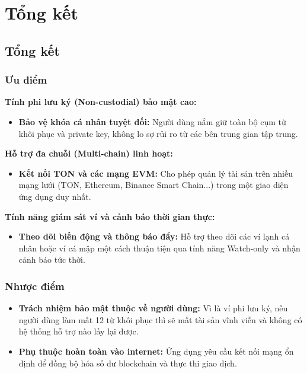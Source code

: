 \documentclass[a4paper]{report}
\begin{document}
\chapter{Tổng kết}

\section{Tổng kết}

\subsection{Ưu điểm}

\textbf{Tính phi lưu ký (Non-custodial) bảo mật cao:}
\begin{itemize}
    \item \textbf{Bảo vệ khóa cá nhân tuyệt đối:} Người dùng nắm giữ toàn bộ cụm từ khôi phục và private key, không lo sợ rủi ro từ các bên trung gian tập trung.
    \end{itemize}

\textbf{Hỗ trợ đa chuỗi (Multi-chain) linh hoạt:}
\begin{itemize}
    \item \textbf{Kết nối TON và các mạng EVM:} Cho phép quản lý tài sản trên nhiều mạng lưới (TON, Ethereum, Binance Smart Chain...) trong một giao diện ứng dụng duy nhất.
\end{itemize}

\textbf{Tính năng giám sát ví và cảnh báo thời gian thực:}
\begin{itemize}
    \item \textbf{Theo dõi biến động và thông báo đẩy:} Hỗ trợ theo dõi các ví lạnh cá nhân hoặc ví cá mập một cách thuận tiện qua tính năng Watch-only và nhận cảnh báo tức thời.
\end{itemize}

\subsection{Nhược điểm}

\begin{itemize}
    \item \textbf{Trách nhiệm bảo mật thuộc về người dùng:} Vì là ví phi lưu ký, nếu người dùng làm mất 12 từ khôi phục thì sẽ mất tài sản vĩnh viễn và không có hệ thống hỗ trợ nào lấy lại được.
    \item \textbf{Phụ thuộc hoàn toàn vào internet:} Ứng dụng yêu cầu kết nối mạng ổn định để đồng bộ hóa số dư blockchain và thực thi giao dịch.
\end{itemize}
\end{document}
